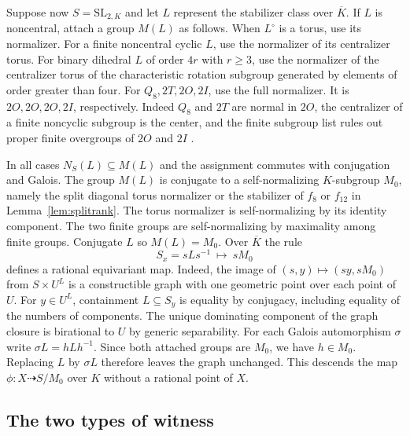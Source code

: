 \documentclass[11pt]{article}
\newcommand{\SL}{\mathrm{SL}}
\begin{document}
Suppose now \(S=\SL_{2,K}\) and let \(L\) represent the stabilizer
class over \(\overline K\). If \(L\) is noncentral, attach a group
\(M(L)\) as follows. When \(L^\circ\) is a torus, use its normalizer.
For a finite noncentral cyclic \(L\), use the normalizer of its
centralizer torus. For binary dihedral \(L\) of order \(4r\) with
\(r\ge3\), use the normalizer of the centralizer torus of the
characteristic rotation subgroup generated by elements of order
greater than four. For \(Q_8,2T,2O,2I\), use the full normalizer.
It is \(2O,2O,2O,2I\), respectively. Indeed \(Q_8\) and \(2T\)
are normal in \(2O\), the centralizer of a finite noncyclic subgroup
is the center, and the finite subgroup list rules out proper finite
overgroups of \(2O\) and \(2I\) \cite{Flicker}.

In all cases \(N_S(L)\subseteq M(L)\) and the assignment commutes
with conjugation and Galois. The group \(M(L)\) is conjugate to a
self-normalizing \(K\)-subgroup \(M_0\), namely the split diagonal
torus normalizer or the stabilizer of \(f_8\) or \(f_{12}\) in
Lemma~\ref{lem:splitrank}. The torus normalizer is self-normalizing
by its identity component. The two finite groups are self-normalizing
by maximality among finite groups. Conjugate \(L\) so \(M(L)=M_0\).
Over \(\overline K\) the rule
\[
             S_x=sLs^{-1}\ \longmapsto\ sM_0
\]
defines a rational equivariant map. Indeed, the image of
\((s,y)\mapsto(sy,sM_0)\) from \(S\times U^L\) is a constructible
graph with one geometric point over each point of \(U\).
For \(y\in U^L\), containment \(L\subseteq S_y\) is equality by
conjugacy, including equality of the numbers of components. The
unique dominating component of the graph closure is birational to
\(U\) by generic separability. For each Galois automorphism
\(\sigma\) write \(\sigma L=hLh^{-1}\). Since both attached groups
are \(M_0\), we have \(h\in M_0\). Replacing \(L\) by \(\sigma L\)
therefore leaves the graph unchanged. This descends the map
\(\phi:X\dashrightarrow S/M_0\) over \(K\) without a rational point of \(X\).

\subsection*{The two types of witness}
\end{document}
